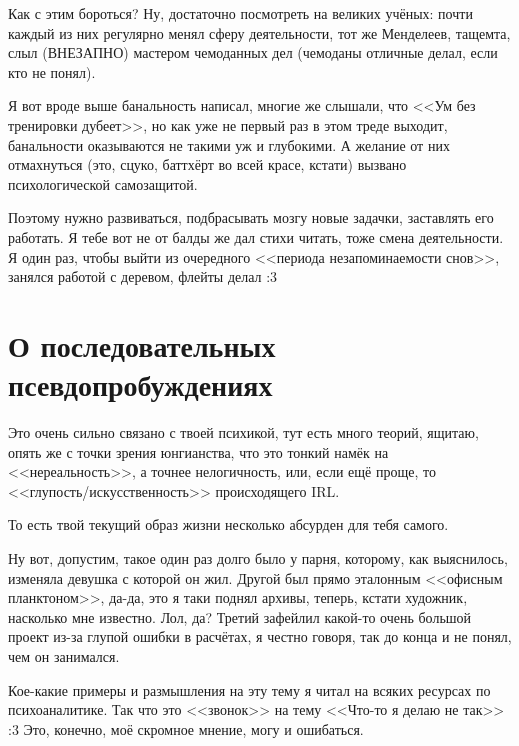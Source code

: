 \documentclass[a5paper,12pt,twoside]{memoir}
\begin{document}
Как с этим бороться? Ну, достаточно посмотреть на великих учёных: почти каждый из них регулярно менял сферу деятельности, тот же Менделеев, тащемта, слыл (ВНЕЗАПНО) мастером чемоданных дел (чемоданы отличные делал, если кто не понял). 

Я вот вроде выше банальность написал, многие же слышали, что <<Ум без тренировки дубеет>>, но как уже не первый раз в этом треде выходит, банальности оказываются не такими уж и глубокими. А желание от них отмахнуться (это, сцуко, баттхёрт во всей красе, кстати) вызвано психологической самозащитой. 

Поэтому нужно развиваться, подбрасывать мозгу новые задачки, заставлять его работать. Я тебе вот не от балды же дал стихи читать, тоже смена деятельности. 
Я один раз, чтобы выйти из очередного <<периода незапоминаемости снов>>, занялся работой с деревом, флейты делал :3





\section{О последовательных псевдопробуждениях}

\medskip
Это очень сильно связано с твоей психикой, тут есть много теорий, ящитаю, опять же с точки зрения юнгианства, что это тонкий намёк на <<нереальность>>, а точнее нелогичность, или, если ещё проще, то <<глупость/ис\-кусс\-твенн\-ость>> происходящего IRL. 

То есть твой текущий образ жизни несколько абсурден для тебя самого. 

Ну вот, допустим, такое один раз долго было у парня, которому, как выяснилось, изменяла девушка с которой он жил. Другой был прямо эталонным <<офисным планктоном>>, да-да, это я таки поднял архивы, теперь, кстати художник, насколько мне известно. Лол, да? Третий зафейлил какой-то очень большой проект из-за глупой ошибки в расчётах, я честно говоря, так до конца и не понял, чем он занимался. 

Кое-какие примеры и размышления на эту тему я читал на всяких ресурсах по психоаналитике. Так что это <<звонок>> на тему <<Что-то я делаю не так>> :3 Это, конечно, моё скромное мнение, могу и ошибаться. 
\end{document}
